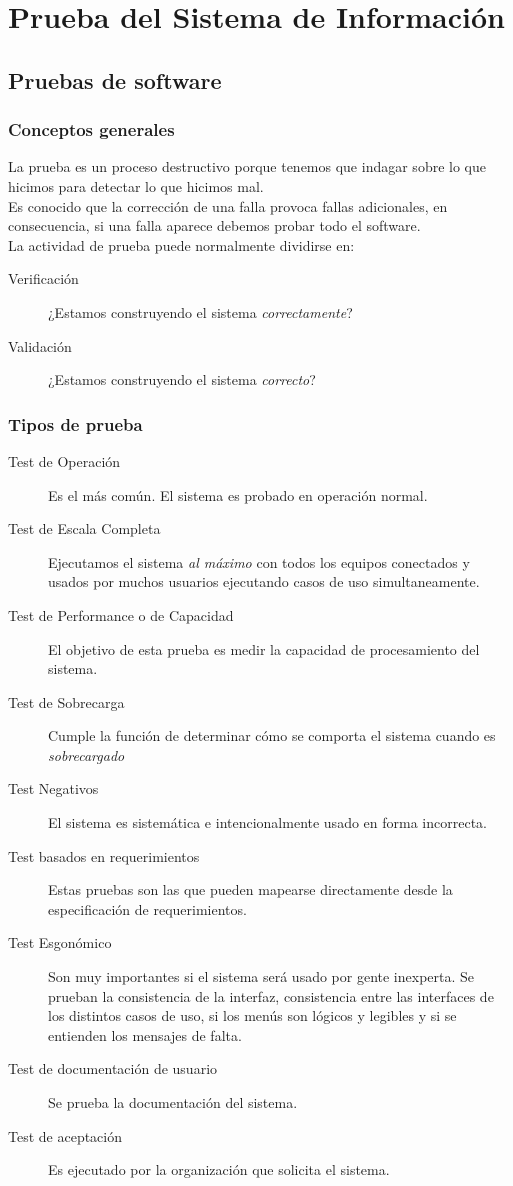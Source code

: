 \section{Prueba del Sistema de Información}
\subsection{Pruebas de software}
\subsubsection{Conceptos generales}
La prueba es un proceso destructivo porque tenemos que indagar sobre lo que hicimos para detectar lo que hicimos mal.\\
Es conocido que la corrección de una falla provoca fallas adicionales, en consecuencia, si una falla aparece debemos probar todo el software.\\
La actividad de prueba puede normalmente dividirse en:
\begin{description}
	\item[Verificación] ¿Estamos construyendo el sistema \emph{correctamente}?
	\item[Validación] ¿Estamos construyendo el sistema \emph{correcto}?
\end{description}
\subsubsection{Tipos de prueba}
\begin{description}
	\item[Test de Operación] Es el más común. El sistema es probado en operación normal.
	\item[Test de Escala Completa] Ejecutamos el sistema \emph{al máximo} con todos los equipos conectados y usados por muchos usuarios ejecutando casos de uso simultaneamente.
	\item[Test de Performance o de Capacidad] El objetivo de esta prueba es medir la capacidad de procesamiento del sistema.
	\item[Test de Sobrecarga] Cumple la función de determinar cómo se comporta el sistema cuando es \emph{sobrecargado}
	\item[Test Negativos] El sistema es sistemática e intencionalmente usado en forma incorrecta.
	\item[Test basados en requerimientos] Estas pruebas son las que pueden mapearse directamente desde la especificación de requerimientos.
	\item[Test Esgonómico] Son muy importantes si el sistema será usado por gente inexperta. Se prueban la consistencia de la interfaz, consistencia entre las interfaces de los distintos casos de uso, si los menús son lógicos y legibles y si se entienden los mensajes de falta.
	\item[Test de documentación de usuario] Se prueba la documentación del sistema.
	\item[Test de aceptación] Es ejecutado por la organización que solicita el sistema.
\end{description}
